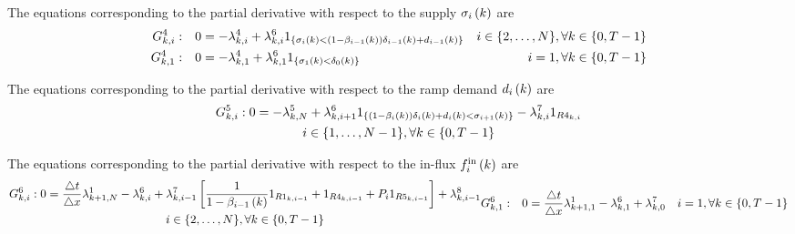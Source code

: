 The equations corresponding to the partial derivative with respect to the supply $\sigma_{i}\left(k\right)$ are
\begin{subequations}
\begin{align}
G^{4}_{k, i}: && 0 &= - \lambda^{4}_{k, i} + \lambda^{6}_{k, i} 
1_{\left\{ \sigma_{i}\left(k\right) < (1-\beta_{i-1}\left(k\right))\delta_{i-1}\left(k\right) + d_{i-1}\left(k\right) \right\}}
& i \in \{2, \dots, N\}, \forall k \in \{0, T - 1\}
\label{eq:}
\\
G^{4}_{k, 1}: && 0 &= - \lambda^{4}_{k, 1} + \lambda^{6}_{k, 1} 
1_{\left\{ \sigma_{1}\left(k\right) < \delta_{0}\left(k\right) \right\}}
& i = 1, \forall k \in \{0, T - 1\}
\label{eq:}
\end{align}
\end{subequations}

The equations corresponding to the partial derivative with respect to the ramp demand $d_{i}\left(k\right)$ are
\begin{multline}
G^{5}_{k, i}: 0 = - \lambda^{5}_{k, N} + \lambda^{6}_{k, i+1}
1_{\left\{ (1-\beta_{i}\left(k\right))\delta_{i}\left(k\right) + d_{i}\left(k\right) < \sigma_{i+1}\left(k\right) \right\}} - 
\lambda^{7}_{k, i} 1_{R{4}_{k, i}}
\\ i \in \{1, \dots, N - 1\}, \forall k \in \{0, T - 1\}
\label{eq:}
\end{multline}

The equations corresponding to the partial derivative with respect to the in-flux $f_{i}^{\text{in}}\left(k\right)$ are
%
\begin{subequations}
\begin{multline}
\stdG{6}: 0 = \frac{\deltat}{\deltax} \Lambd{1}{\itime+1}{\ncell} - \Lambd{6}{\itime}{\icell} + \Lambd{7}{\itime}{\icell-1} \left[ \frac{1}{1-\offrampratio{\icell - 1}{\itime}} 1_{\R{1}{\itime}{\icell-1}} + 1_{\R{4}{\itime}{\icell-1}} + \priority{\icell} 1_{\R{5}{\itime}{\icell-1}} \right] + \Lambd{8}{\itime}{\icell-1}
\\ \icell \in \{2, \dots, \ncell \}, \forall \itime \in \{0, \ntime - 1\}
\label{eq:}
\end{multline}
%
\begin{align}
\G{6}{\itime}{1}: && 0 = \frac{\deltat}{\deltax} \Lambd{1}{\itime+1}{1} - \Lambd{6}{\itime}{1} + \Lambd{7}{\itime}{0}
&& \icell = 1, \forall \itime \in \{0, \ntime - 1\}
\label{eq:}
\end{align}
\end{subequations}

